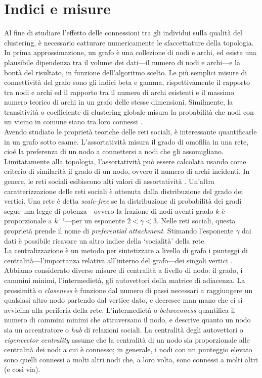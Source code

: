 \section{Indici e misure}
Al fine di studiare l'effetto delle connessioni tra gli individui sulla qualit\`a del clustering, \`e necessario catturare numericamente le sfaccettature della topologia. In prima approssimazione, un grafo \`e una collezione di nodi e archi, ed esiste una plausibile dipendenza tra il volume dei dati---il numero di nodi e archi---e la bont\`a del risultato, in funzione dell'algoritmo scelto.
Le pi\`u semplici misure di connettivit\`a del grafo sono gli indici beta e gamma, rispettivamente il rapporto tra nodi e archi ed il rapporto tra il numero di archi esistenti e il massimo numero teorico di archi in un grafo delle stesse dimensioni. Similmente, la transitivit\`a o coefficiente di clustering globale misura la probabilit\`a che nodi con un vicino in comune siano tra loro connessi \cite{wasserman1994social}.\\
Avendo studiato le propriet\`a teoriche delle reti sociali, \`e interessante quantificarle in un grafo sotto esame. L'assortativit\`a misura il grado di omofilia in una rete, cio\'e la preferenza di un nodo a connettersi a nodi che gli assomigliano. Limitatamente alla topologia, l'assortativit\`a pu\`o essere calcolata usando come criterio di similarit\`a il grado di un nodo, ovvero il numero di archi incidenti. In genere, le reti sociali esibiscono alti valori di assortativit\`a \cite{newman03social,newman02}. Un'altra caratterizzazione delle reti sociali \`e ottenuta dalla distribuzione del grado dei vertici. Una rete \`e detta \textit{scale-free} se la distribuzione di probabilit\`a dei gradi segue una legge di potenza---ovvero la frazione di nodi aventi grado $k$ \`e proporzionale a $k^{-\gamma}$---per un esponente $2<\gamma<3$. Nelle reti sociali, questa propriet\`a prende il nome di \textit{preferential attachment}\cite{Barabasi99emergenceScaling}. Stimando l'esponente $\gamma$ dai dati \`e possibile ricavare un altro indice della `socialit\`a' della rete.\\
La centralizzazione \`e un metodo per sintetizzare a livello di grafo i punteggi di centralit\`a---l'importanza relativa all'interno del grafo---dei singoli vertici \cite{freeman1979centrality,wasserman1994social}. Abbiamo considerato diverse misure di centralit\`a a livello di nodo: il grado, i cammini minimi, l'intermediet\`a, gli autovettori della matrice di adiacenza. La prossimit\`a o \textit{closeness} \`e funzione dal numero di passi necessari a raggiungere un qualsiasi altro nodo partendo dal vertice dato, e decresce man mano che ci si avvicina alla periferia della rete. L'intermediet\`a o \textit{betweenness} quantifica il numero di cammini minimi che attraversano il nodo, e descrive quanto un nodo sia un accentratore o \textit{hub} di relazioni sociali. La centralit\`a degli autovettori o \textit{eigenvector centrality} \cite{bonacich1987power} assume che la centralit\`a di un nodo sia proporzionale alle centralit\`a dei nodi a cui \`e connesso; in generale, i nodi con un punteggio elevato sono quelli connessi a molti altri nodi che, a loro volta, sono connessi a molti altri (e cos\`i via).\\
